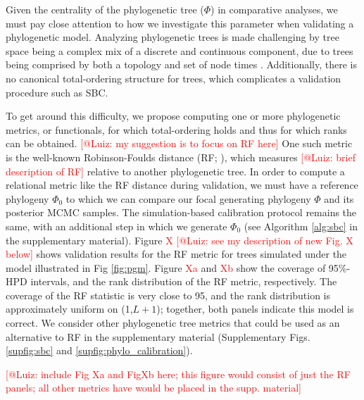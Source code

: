 \documentclass[oneside]{article}
\begin{document}
\begin{tcolorbox}[breakable, width=\textwidth, colback=gray!10, boxrule=0pt,
  title=Box 1: Validating a phylogenetic model with respect to its
  phylogenetic tree parameter, fonttitle=\bfseries]
  \small 

  Given the centrality of the phylogenetic tree ($\Phi$) in comparative
  analyses, we must pay close attention to how we investigate this
  parameter when validating a phylogenetic model.
  Analyzing phylogenetic trees is made challenging by tree space
  being a complex mix of a discrete and continuous component, due to
  trees being comprised by both a topology and set of node times
  \citep{semple03,gavryushkin16}.
  Additionally, there is no canonical total-ordering  structure for
  trees, which complicates a validation procedure such as SBC.

  \vspace{.25cm}
  To get around this difficulty, we propose computing one or more phylogenetic
  metrics, or functionals, for which total-ordering holds
  and thus for which ranks can be obtained.
  \textcolor{red}{[@Luiz: my suggestion is to focus on RF here]}
  One such metric is the well-known Robinson-Foulds distance (RF; \citealp{Robinson1981}),
  which measures \textcolor{red}{[@Luiz: brief description of RF]}
  relative to another phylogenetic tree.
  In order to compute a relational metric like the RF distance during
  validation, we must have a reference phylogeny $\Phi_0$ to which
  we can compare our focal generating phylogeny $\Phi$ and its
  posterior MCMC samples.
  The simulation-based calibration protocol remains the same, with
  an additional step in which we generate $\Phi_0$ (see Algorithm
  \ref{alg:sbc} in the supplementary material).
  Figure \textcolor{red}{X [@Luiz: see my description of new Fig. X below]} shows
  validation results for the RF metric for trees simulated under the model
  illustrated in Fig \ref{fig:pgm}. 
  Figure \textcolor{red}{Xa} and \textcolor{red}{Xb} show the coverage of 95\%-HPD
  intervals, and the rank distribution of the RF metric, respectively.
  The coverage of the RF statistic is very close to 95, and the rank distribution
  is approximately uniform on (1,$L+1$); together, both panels indicate this model
  is correct.
  We consider other phylogenetic tree metrics that could be used as an alternative
  to RF in the supplementary material (Supplementary
  Figs. \ref{supfig:sbc} and \ref{supfig:phylo_calibration}).

  \textcolor{red}{[@Luiz: include Fig Xa and FigXb here; this figure
    would consist of just the RF panels; all other metrics have would
    be placed in the supp. material]}
\end{tcolorbox}
\end{document}
